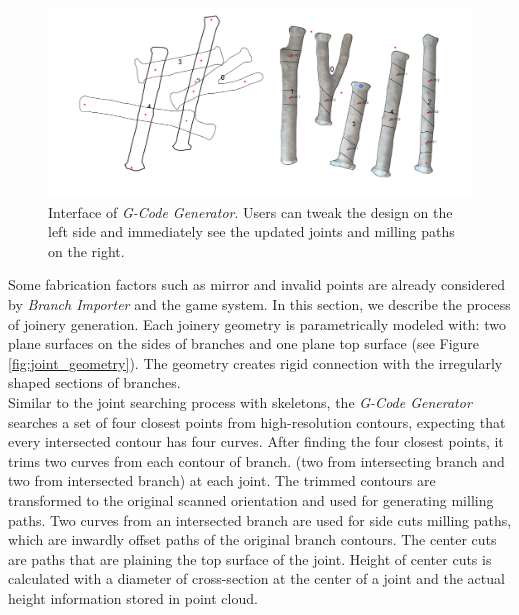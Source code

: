 \begin{figure}[ht]
  \begin{center}
    \includegraphics[width = 0.4\paperwidth]{images/system/joint_generator_2.png}
    \caption{Interface of \textit{G-Code Generator}. Users can tweak the design on the left side and immediately see the updated joints and milling paths on the right. }
    \label{fig:gcode_gen}
  \end{center}
\end{figure}

Some fabrication factors such as mirror and invalid points are already considered by \textit{Branch Importer} and the game system.
In this section, we describe the process of joinery generation.
Each joinery geometry is parametrically modeled with: two plane surfaces on the sides of branches and one plane top surface (see Figure \ref{fig:joint_geometry}).
The geometry creates rigid connection with the irregularly shaped sections of branches.\\

Similar to the joint searching process with skeletons, the \textit{G-Code Generator} searches a set of four closest points from high-resolution contours, expecting that every intersected contour has four curves.
After finding the four closest points, it trims two curves from each contour of branch. (two from intersecting branch and two from intersected branch) at each joint.
The trimmed contours are transformed to the original scanned orientation and used for generating milling paths.
Two curves from an intersected branch are used for side cuts milling paths, which are inwardly offset paths of the original branch contours. 
The center cuts are paths that are plaining the top surface of the joint.
Height of center cuts is calculated with a diameter of cross-section at the center of a joint and the actual height information stored in point cloud. 


